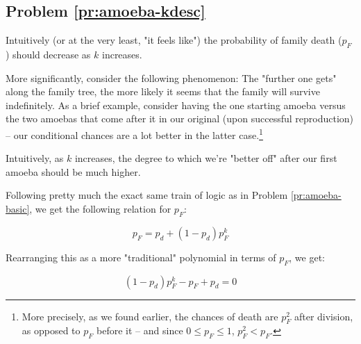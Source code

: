 

\subsection{Problem \ref{pr:amoeba-kdesc}}

Intuitively (or at the very least, "it feels like") the probability of family death ($p_F$) should decrease as $k$ increases.

More significantly, consider the following phenomenon: The "further one gets" along the family tree, the more likely it seems that the family will survive indefinitely. As a brief example, consider having the one starting amoeba versus the two amoebas that come after it in our original (upon successful reproduction) -- our conditional chances are a lot better in the latter case.\footnote{More precisely, as we found earlier, the chances of death are $p_F^2$ after division, as opposed to $p_F$ before it -- and since $0 \leq p_F \leq 1$, $p_F^2 < p_F$.}

Intuitively, as $k$ increases, the degree to which we're "better off" after our first amoeba should be much higher. 


Following pretty much the exact same train of logic as in Problem \ref{pr:amoeba-basic}, we get the following relation for $p_F$:

\begin{equation}
p_F = p_d + (1-p_d)p_F^k
\end{equation}

Rearranging this as a more "traditional" polynomial in terms of $p_F$, we get:

\begin{equation}
(1-p_d)p_F^k - p_F + p_d = 0
\end{equation}





